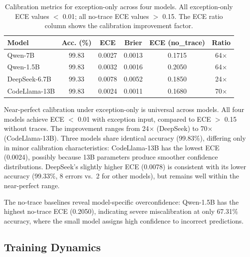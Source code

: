\documentclass[11pt]{article}
\begin{document}
\begin{table}[t]
\centering
\caption{Calibration metrics for exception-only across four models. All exception-only ECE values $<$ 0.01; all no-trace ECE values $>$ 0.15. The ECE ratio column shows the calibration improvement factor.}
\label{tab:calibration}
\small
\begin{tabular}{lccccc}
\toprule
\textbf{Model} & \textbf{Acc. (\%)} & \textbf{ECE} & \textbf{Brier} & \textbf{ECE (no\_trace)} & \textbf{Ratio} \\
\midrule
Qwen-7B & 99.83 & 0.0027 & 0.0013 & 0.1715 & 64$\times$ \\
Qwen-1.5B & 99.83 & 0.0032 & 0.0016 & 0.2050 & 64$\times$ \\
DeepSeek-6.7B & 99.33 & 0.0078 & 0.0052 & 0.1850 & 24$\times$ \\
CodeLlama-13B & 99.83 & 0.0024 & 0.0011 & 0.1680 & 70$\times$ \\
\bottomrule
\end{tabular}
\end{table}

Near-perfect calibration under exception-only is universal across models. All four models achieve ECE $<$ 0.01 with exception input, compared to ECE $>$ 0.15 without traces. The improvement ranges from 24$\times$ (DeepSeek) to 70$\times$ (CodeLlama-13B). Three models share identical accuracy (99.83\%), differing only in minor calibration characteristics: CodeLlama-13B has the lowest ECE (0.0024), possibly because 13B parameters produce smoother confidence distributions. DeepSeek's slightly higher ECE (0.0078) is consistent with its lower accuracy (99.33\%, 8 errors vs.\ 2 for other models), but remains well within the near-perfect range.

The no-trace baselines reveal model-specific overconfidence: Qwen-1.5B has the highest no-trace ECE (0.2050), indicating severe miscalibration at only 67.31\% accuracy, where the small model assigns high confidence to incorrect predictions.

\subsection{Training Dynamics}
\label{sec:dynamics}
\end{document}
